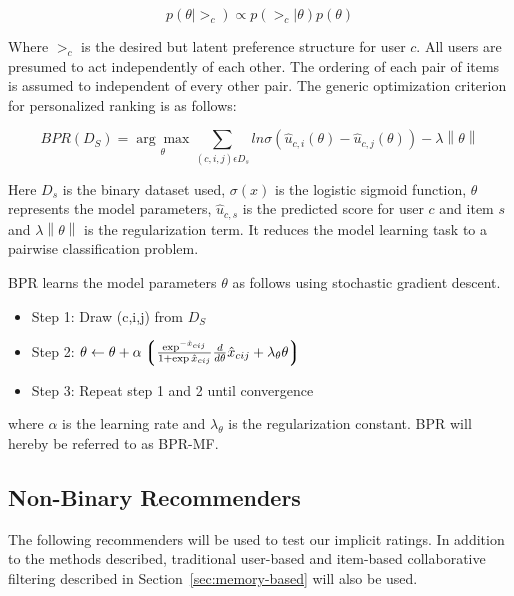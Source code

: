 \begin{equation}
p(\theta | >_c) \propto p(>_c | \theta) p(\theta)
\end{equation}

Where $>_c$ is the desired but latent preference structure for user $c$. All users are presumed to act
independently of each other. The ordering of each pair of items is assumed to independent of every other pair.
The generic optimization criterion for personalized ranking is as follows:

\begin{equation}
BPR(D_S) = \underset{\theta}{\arg\max} \sum_{(c,i,j)\epsilon D_s} ln \sigma(\hat{u}_{c,i}(\theta)-\hat{u}_{c,j}(\theta)) - \lambda \left\|\theta \right\|
\end{equation}

Here $D_s$ is the binary dataset used, $\sigma(x)$ is the logistic sigmoid function, $\theta$ represents
the model parameters, $\hat{u}_{c,s}$ is the predicted score for user $c$ and item $s$ and
$\lambda \left\|\theta \right\|$ is the regularization term. It reduces the model learning task to
a pairwise classification problem.\newline

BPR learns the model parameters $\theta$ as follows using stochastic gradient descent.

\begin{itemize}
\item Step 1: Draw (c,i,j) from $D_S$
\item Step 2: $\theta \leftarrow \theta + \alpha \left\lgroup \frac{\exp^{-\hat{x}_{cij}}}{1+\exp{\hat{x}_{cij}}}  \frac{d}{d \theta} \hat{x}_{cij} + \lambda_{\theta} \theta \right\rgroup$
\item Step 3: Repeat step 1 and 2 until convergence
\end{itemize}

where $\alpha$ is the learning rate and $\lambda_{\theta}$ is the regularization constant. BPR will hereby be
referred to as BPR-MF.

\subsection{Non-Binary Recommenders}

The following recommenders will be used to test our implicit ratings. In addition to the methods described,
traditional user-based and item-based collaborative filtering described in Section~\ref{sec:memory-based} will
also be used.

